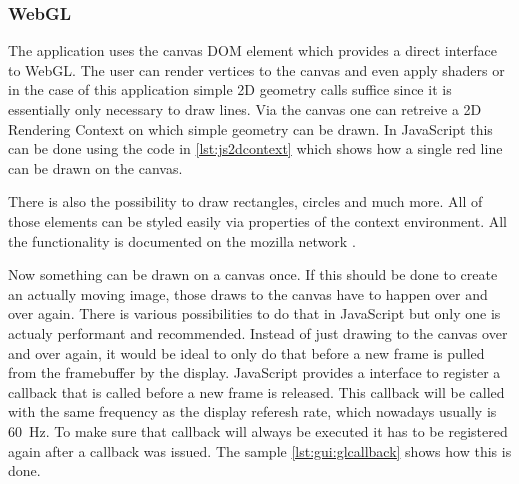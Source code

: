 %
%

\subsubsection{WebGL}
\label{subsec:gui:webgl}

The application uses the canvas DOM  element which provides a direct interface
to WebGL. The user can render vertices to the canvas and even apply shaders or
in the case of  this application simple 2D geometry calls  suffice since it is
essentially only necessary to draw lines.
Via  the canvas  one  can retreive  a  2D Rendering  Context  on which  simple
geometry can be drawn.
In JavaScript this  can be done using the code  in \ref{lst:js2dcontext} which
shows how a single red line can be drawn on the canvas.


There is also  the possibility to draw rectangles, circles  and much more. All
of  those  elements  can  be  styled easily  via  properties  of  the  context
environment. All  the  functionality  is  documented on  the  mozilla  network
\cite{moz:2dcontext}.

Now something can be drawn on a  canvas once. If this should be done to create
an actually moving  image, those draws to  the canvas have to  happen over and
over again. There is  various possibilities to do that in  JavaScript but only
one  is actualy  performant and  recommended. Instead of  just drawing  to the
canvas over  and over again, it  would be ideal to  only do that before  a new
frame is  pulled from  the framebuffer by  the display. JavaScript  provides a
interface  to  register a  callback  that  is called  before  a  new frame  is
released. This callback will be called with  the same frequency as the display
referesh rate, which nowadays usually is \SI{60}{\hertz}.
To make  sure that callback  will always be executed  it has to  be registered
again after  a callback was issued. The  sample \ref{lst:gui:glcallback} shows
how this is done.

